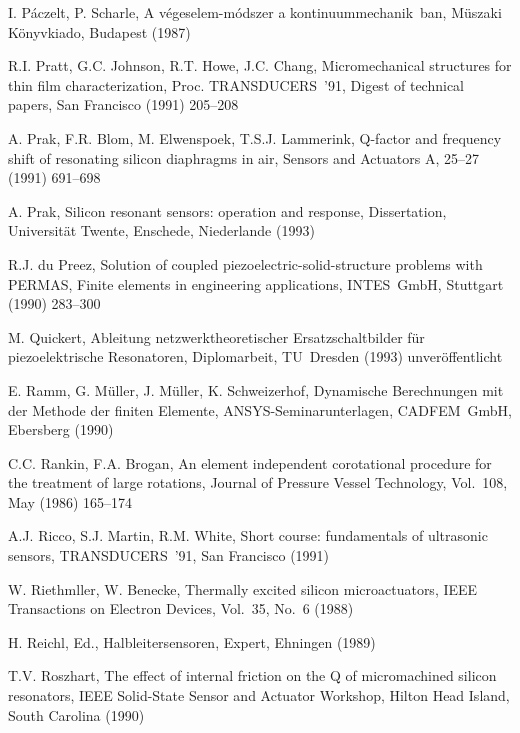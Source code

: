 \begin{thebibliography}{xxx}
 I. Páczelt, P. Scharle, A végeselem-módszer a kontinuummechanik ban,
 Müszaki Könyvkiado, Budapest (1987)

 R.I. Pratt, G.C. Johnson, R.T. Howe, J.C. Chang, Micromechanical structures
 for thin film characterization, Proc. TRANSDUCERS~'91, Digest of technical
 papers, San Francisco (1991) 205--208

 A. Prak, F.R. Blom, M. Elwenspoek, T.S.J. Lammerink, Q-factor and frequency
 shift of resonating silicon diaphragms in air, Sensors and Actuators A,
 25--27 (1991) 691--698

 A. Prak, Silicon resonant sensors: operation and response, Dissertation,
 Universität Twente, Enschede, Niederlande (1993)

 R.J. du Preez, Solution of coupled piezoelectric-solid-structure problems
 with PERMAS, Finite elements in engineering applications, INTES~GmbH,
 Stuttgart (1990) 283--300

 M. Quickert, Ableitung netzwerktheoretischer Ersatzschaltbilder für
 piezoelektrische Resonatoren, Diplomarbeit, TU~Dresden (1993)
 unveröffentlicht

 E. Ramm, G. Müller, J. Müller, K. Schweizerhof,
 Dynamische Berechnungen mit der Methode der finiten Elemente,
 {\sf ANSYS}-Seminarunterlagen, CADFEM~GmbH, Ebersberg (1990)

 C.C. Rankin, F.A. Brogan, An element independent corotational procedure
 for the treatment of large rotations, Journal of Pressure Vessel Technology,
 Vol.~108, May (1986) 165--174

 A.J. Ricco, S.J. Martin, R.M. White, Short course: fundamentals of
 ultrasonic sensors, TRANSDUCERS~'91, San Francisco (1991)

 W. Riethmller, W. Benecke, Thermally excited silicon microactuators,
 IEEE Transactions on Electron Devices, Vol.~35, No.~6 (1988)

 H. Reichl, Ed., Halbleitersensoren, Expert, Ehningen (1989)

 T.V. Roszhart, The effect of internal friction on the Q of micromachined
 silicon resonators, IEEE Solid-State Sensor and Actuator Workshop,
 Hilton Head Island, South Carolina (1990)


\end{thebibliography}
